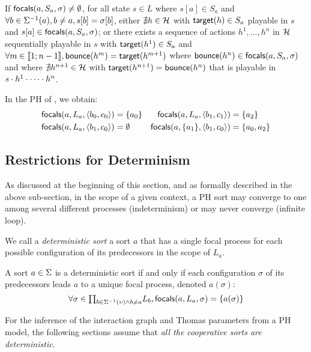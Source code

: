 \begin{property}
\label{pro:has-focals}
If $\mathsf{focals}(a,S_a,\sigma)\neq\emptyset$, for all
state $s\in L$
where
$s[a]\in S_a$ and
$\forall b\in \Sigma^{-1}(a), b\neq a, s[b] = \sigma[b]$,
either
$\nexists h\in\mathcal{H}$ with $\mathsf{target}(h)\in S_a$  playable in $s$ and
$s[a]\in\mathsf{focals}(a,S_a,\sigma)$;
or
there exists a sequence of actions $h^1,\dots,h^n$ in $\mathcal{H}$ sequentially playable in $s$ with
$\mathsf{target}(h^1)\in S_a$ and
$\forall m\in\llbracket 1 ; n-1 \rrbracket, \mathsf{bounce}(h^m)=\mathsf{target}(h^{m+1})$
where
 $\mathsf{bounce}(h^n) \in \mathsf{focals}(a,S_a,\sigma)$
 and
 where 
$\nexists h^{n+1}\in \mathcal{H}$ with $\mathsf{target}(h^{n+1})=\mathsf{bounce}(h^n)$ 
that is playable in $s\cdot h^1\cdot \cdots \cdot h^n$.
\end{property}



\begin{example}
In the PH of , we obtain:
\begin{align*}
\mathsf{focals}(a,L_a,\langle b_0,c_0 \rangle) &= \{ a_0 \}
&
\mathsf{focals}(a,L_a,\langle b_1,c_1 \rangle) &= \{ a_2 \}
\\
\mathsf{focals}(a,L_a,\langle b_1,c_0 \rangle) &= \emptyset
&
\mathsf{focals}(a,\{a_1\},\langle b_1,c_0 \rangle) &= \{ a_0, a_2 \}
\end{align*}
\end{example}

\subsection{Restrictions for Determinism} %
\label{ssec:dfocals}

As discussed at the beginning of this section, and as formally described in the above sub-section, 
in the scope of a given context,
a PH sort may converge to one among several different processes (indeterminism) or may never converge
(infinite loop).

We call a \emph{deterministic sort}  a sort $a$
that has a single focal process for each possible configuration of its predecessors in the scope of
$L_a$.

\begin{definition}\label{def:deterministic-sort}
A sort $a\in\Sigma$ is a deterministic sort if and only if
each configuration $\sigma$ of its predecessors leads $a$ to a unique focal process,
denoted $a(\sigma)$:
\[
\forall \sigma \in {\textstyle\prod_{
b\in\Sigma^{-1}(\upsilon) \wedge b\neq a}}
L_{b},
\mathsf{focals}(a,L_a,\sigma) = \{ a(\sigma) \}\]
\end{definition}


For the inference of the interaction graph and Thomas parameters from a PH model, the following
sections assume that \emph{all the cooperative sorts are deterministic}.
